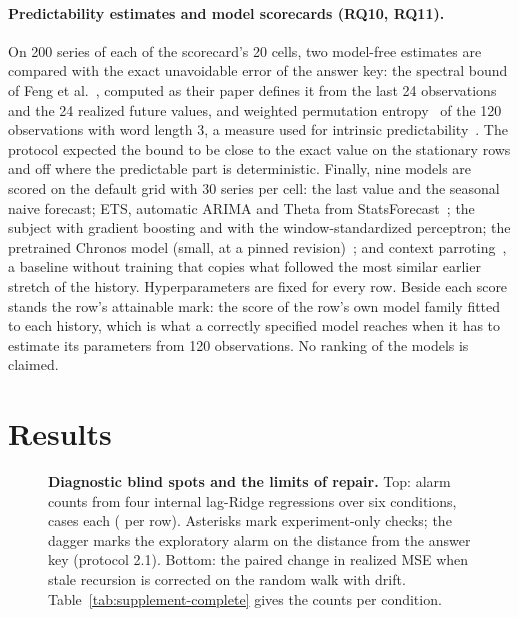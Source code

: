 \documentclass[11pt,a4paper]{article}
\begin{document}
\paragraph{Predictability estimates and model scorecards (RQ10, RQ11).}
On 200 series of each of the scorecard's 20 cells, two model-free
estimates are compared with the exact unavoidable error of the answer
key: the spectral bound of Feng et al.~\cite{feng2026beyond}, computed as
their paper defines it from the last 24 observations and the 24 realized
future values, and weighted permutation entropy~\cite{garland2014model}
of the 120 observations with word length 3, a measure used for intrinsic
predictability~\cite{pennekamp2019intrinsic}. The protocol expected the
bound to be close to the exact value on the stationary rows and off where
the predictable part is deterministic. Finally, nine models are scored on
the default grid with 30 series per cell: the last value and the seasonal
naive forecast; ETS, automatic ARIMA and Theta from
StatsForecast~\cite{statsforecast2026}; the subject with gradient boosting
and with the window-standardized perceptron; the pretrained Chronos model
(small, at a pinned revision)~\cite{ansari2024chronos}; and context
parroting~\cite{zhang2026context}, a baseline without training that copies
what followed the most similar earlier stretch of the history.
Hyperparameters are fixed for every row. Beside each score stands the
row's attainable mark: the score of the row's own model family fitted to
each history, which is what a correctly specified model reaches when it
has to estimate its parameters from 120 observations. No ranking of the
models is claimed.

\section{Results}
\label{sec:results}


\begin{figure}[!t]
\centering

\caption{\textbf{Diagnostic blind spots and the limits of repair.}
Top: alarm counts from four internal lag-Ridge regressions over six
conditions, \CasesPerCondition{} cases each (\CasesPerRow{} per row).
Asterisks mark experiment-only checks; the dagger marks the exploratory
alarm on the distance from the answer key (protocol 2.1). Bottom: the
paired change in realized MSE when stale recursion is corrected on the
random walk with drift. Table~\ref{tab:supplement-complete} gives the
counts per condition.}
\label{fig:diagnostic-evidence}
\end{figure}
\end{document}
